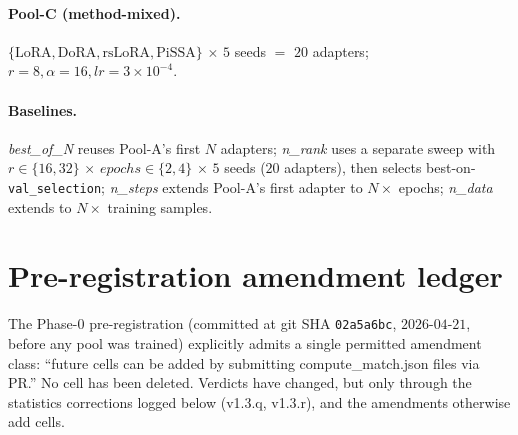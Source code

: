 \documentclass[11pt]{article}
\begin{document}
\paragraph{Pool-C (method-mixed).} $\{\text{LoRA}, \text{DoRA}, \text{rsLoRA}, \text{PiSSA}\}$ $\times$ $5$ seeds $=$ $20$ adapters; $r{=}8, \alpha{=}16, lr{=}3{\times}10^{-4}$.

\paragraph{Baselines.} \emph{best\_of\_N} reuses Pool-A's first $N$ adapters; \emph{n\_rank} uses a separate sweep with $r{\in}\{16, 32\}$ $\times$ $epochs{\in}\{2, 4\}$ $\times$ $5$ seeds ($20$ adapters), then selects best-on-\texttt{val\_selection}; \emph{n\_steps} extends Pool-A's first adapter to $N{\times}$ epochs; \emph{n\_data} extends to $N{\times}$ training samples.

\section{Pre-registration amendment ledger}\label{app:prereg}
The Phase-0 pre-registration (committed at git SHA \texttt{02a5a6bc}, $2026$-$04$-$21$, before any pool was trained) explicitly admits a single permitted amendment class: ``future cells can be added by submitting compute\_match.json files via PR.'' No cell has been deleted. Verdicts have changed, but only through the statistics corrections logged below (v1.3.q, v1.3.r), and the amendments otherwise add cells.
\end{document}
